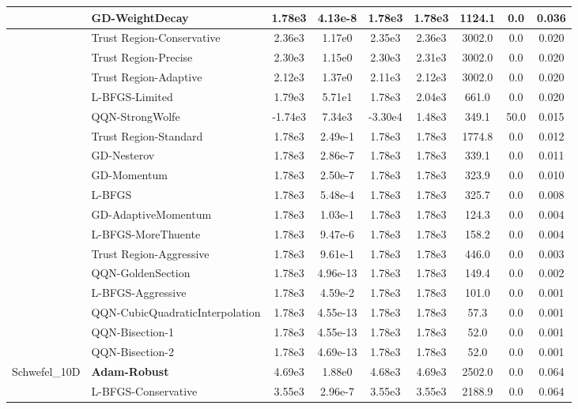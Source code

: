 \documentclass{article}
\begin{document}
\begin{longtable}{|l|l|c|c|c|c|c|c|c|}
\hline
 & GD-WeightDecay & 1.78e3 & 4.13e-8 & 1.78e3 & 1.78e3 & 1124.1 & 0.0 & 0.036 \\
\hline
 & Trust Region-Conservative & 2.36e3 & 1.17e0 & 2.35e3 & 2.36e3 & 3002.0 & 0.0 & 0.020 \\
\hline
 & Trust Region-Precise & 2.30e3 & 1.15e0 & 2.30e3 & 2.31e3 & 3002.0 & 0.0 & 0.020 \\
\hline
 & Trust Region-Adaptive & 2.12e3 & 1.37e0 & 2.11e3 & 2.12e3 & 3002.0 & 0.0 & 0.020 \\
\hline
 & L-BFGS-Limited & 1.79e3 & 5.71e1 & 1.78e3 & 2.04e3 & 661.0 & 0.0 & 0.020 \\
\hline
 & QQN-StrongWolfe & -1.74e3 & 7.34e3 & -3.30e4 & 1.48e3 & 349.1 & 50.0 & 0.015 \\
\hline
 & Trust Region-Standard & 1.78e3 & 2.49e-1 & 1.78e3 & 1.78e3 & 1774.8 & 0.0 & 0.012 \\
\hline
 & GD-Nesterov & 1.78e3 & 2.86e-7 & 1.78e3 & 1.78e3 & 339.1 & 0.0 & 0.011 \\
\hline
 & GD-Momentum & 1.78e3 & 2.50e-7 & 1.78e3 & 1.78e3 & 323.9 & 0.0 & 0.010 \\
\hline
 & L-BFGS & 1.78e3 & 5.48e-4 & 1.78e3 & 1.78e3 & 325.7 & 0.0 & 0.008 \\
\hline
 & GD-AdaptiveMomentum & 1.78e3 & 1.03e-1 & 1.78e3 & 1.78e3 & 124.3 & 0.0 & 0.004 \\
\hline
 & L-BFGS-MoreThuente & 1.78e3 & 9.47e-6 & 1.78e3 & 1.78e3 & 158.2 & 0.0 & 0.004 \\
\hline
 & Trust Region-Aggressive & 1.78e3 & 9.61e-1 & 1.78e3 & 1.78e3 & 446.0 & 0.0 & 0.003 \\
\hline
 & QQN-GoldenSection & 1.78e3 & 4.96e-13 & 1.78e3 & 1.78e3 & 149.4 & 0.0 & 0.002 \\
\hline
 & L-BFGS-Aggressive & 1.78e3 & 4.59e-2 & 1.78e3 & 1.78e3 & 101.0 & 0.0 & 0.001 \\
\hline
 & QQN-CubicQuadraticInterpolation & 1.78e3 & 4.55e-13 & 1.78e3 & 1.78e3 & 57.3 & 0.0 & 0.001 \\
\hline
 & QQN-Bisection-1 & 1.78e3 & 4.55e-13 & 1.78e3 & 1.78e3 & 52.0 & 0.0 & 0.001 \\
\hline
 & QQN-Bisection-2 & 1.78e3 & 4.69e-13 & 1.78e3 & 1.78e3 & 52.0 & 0.0 & 0.001 \\
Schwefel\_10D & \textbf{Adam-Robust} & 4.69e3 & 1.88e0 & 4.68e3 & 4.69e3 & 2502.0 & 0.0 & 0.064 \\
\hline
 & L-BFGS-Conservative & 3.55e3 & 2.96e-7 & 3.55e3 & 3.55e3 & 2188.9 & 0.0 & 0.064 \\

\end{longtable}
\end{document}

